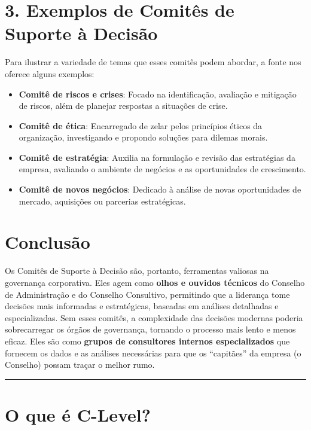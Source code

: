 \documentclass[
]{book}
\providecommand{\tightlist}{%
  \setlength{\itemsep}{0pt}\setlength{\parskip}{0pt}}
\begin{document}
\section{3. Exemplos de Comitês de Suporte à Decisão}\label{exemplos-de-comituxeas-de-suporte-uxe0-decisuxe3o}

Para ilustrar a variedade de temas que esses comitês podem abordar, a fonte nos oferece alguns exemplos:

\begin{itemize}
\tightlist
\item
  \textbf{Comitê de riscos e crises}: Focado na identificação, avaliação e mitigação de riscos, além de planejar respostas a situações de crise.
\item
  \textbf{Comitê de ética}: Encarregado de zelar pelos princípios éticos da organização, investigando e propondo soluções para dilemas morais.
\item
  \textbf{Comitê de estratégia}: Auxilia na formulação e revisão das estratégias da empresa, avaliando o ambiente de negócios e as oportunidades de crescimento.
\item
  \textbf{Comitê de novos negócios}: Dedicado à análise de novas oportunidades de mercado, aquisições ou parcerias estratégicas.
\end{itemize}

\section{Conclusão}\label{conclusuxe3o}

Os Comitês de Suporte à Decisão são, portanto, ferramentas valiosas na governança corporativa. Eles agem como \textbf{olhos e ouvidos técnicos} do Conselho de Administração e do Conselho Consultivo, permitindo que a liderança tome decisões mais informadas e estratégicas, baseadas em análises detalhadas e especializadas. Sem esses comitês, a complexidade das decisões modernas poderia sobrecarregar os órgãos de governança, tornando o processo mais lento e menos eficaz. Eles são como \textbf{grupos de consultores internos especializados} que fornecem os dados e as análises necessárias para que os ``capitães'' da empresa (o Conselho) possam traçar o melhor rumo.

\begin{center}\rule{0.5\linewidth}{0.5pt}\end{center}

\section{O que é C-Level?}\label{o-que-uxe9-c-level}
\end{document}
